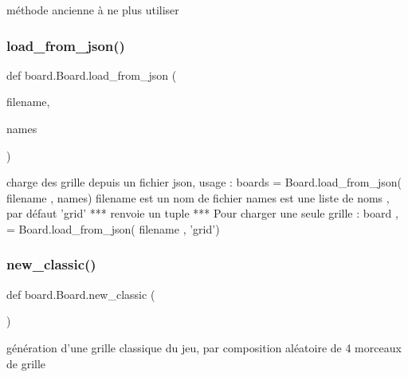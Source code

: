 \begin{DoxyVerb}méthode ancienne à ne plus utiliser \end{DoxyVerb}
 \mbox{\label{classboard_1_1Board_a6c8cc235162403c41d7a6b1ee9bb4fd7}} 
\subsubsection{\texorpdfstring{load\+\_\+from\+\_\+json()}{load\_from\_json()}}
{\footnotesize\ttfamily def board.\+Board.\+load\+\_\+from\+\_\+json (\begin{DoxyParamCaption}\item[{}]{filename,  }\item[{}]{names }\end{DoxyParamCaption})\hspace{0.3cm}{\ttfamily [static]}}

\begin{DoxyVerb}charge des grille depuis un fichier json,
    usage  : boards =  Board.load_from_json( filename , names)
    filename est un nom de fichier
    names est une liste de noms , par défaut 'grid'
    *** renvoie un tuple ***
    Pour charger une seule grille :
    board , = Board.load_from_json( filename , 'grid')
\end{DoxyVerb}
 \mbox{\label{classboard_1_1Board_a91650ef03892e24f144d1adeb0e5addc}} 
\subsubsection{\texorpdfstring{new\+\_\+classic()}{new\_classic()}}
{\footnotesize\ttfamily def board.\+Board.\+new\+\_\+classic (\begin{DoxyParamCaption}{ }\end{DoxyParamCaption})\hspace{0.3cm}{\ttfamily [static]}}

\begin{DoxyVerb}génération d'une grille classique du jeu, par composition aléatoire de 4 morceaux de grille\end{DoxyVerb}
 \mbox{\label{classboard_1_1Board_aa8ced227328068a4365e0709d3563067}} 
